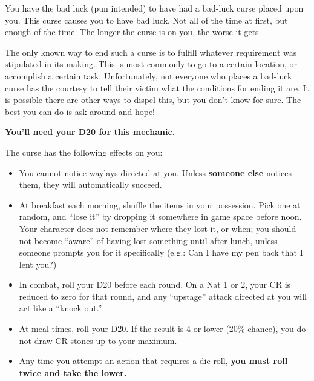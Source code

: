 \documentclass[green]{GL2020}
\begin{document}
\name{\gBadLuckCurse{}}

You have the bad luck (pun intended) to have had a bad-luck curse placed upon you. This curse causes you to have bad luck. Not all of the time at first, but enough of the time. The longer the curse is on you, the worse it gets.

The only known way to end such a curse is to fulfill whatever requirement was stipulated in its making. This is most commonly to go to a certain location, or accomplish a certain task. Unfortunately, not everyone who places a bad-luck curse has the courtesy to tell their victim what the conditions for ending it are. It is possible there are other ways to dispel this, but you don’t know for sure. The best you can do is ask around and hope!

\textbf{You’ll need your D20  for this mechanic.}

The curse has the following effects on you:
\begin{itemize}
  \item You cannot notice waylays directed at you. Unless \textbf{someone else} notices them, they will automatically succeed.
  \item At breakfast each morning, shuffle the items in your possession. Pick one at random, and ``lose it'' by dropping it somewhere in game space before noon. Your character does not remember where they lost it, or when; you should not become ``aware'' of having lost something until after lunch, unless someone prompts you for it specifically (e.g.: Can I have my pen back that I lent you?)
  \item In combat, roll your D20 before each round. On a Nat 1 or 2, your CR is reduced to zero for that round, and any ``upstage'' attack directed at you will act like a ``knock out.''
  \item At meal times, roll your D20. If the result is 4 or lower (20\% chance), you do not draw CR stones up to your maximum.
  \item Any time you attempt an action that requires a die roll, \textbf{you must roll twice and take the lower.}
\end{itemize}
\end{document}

